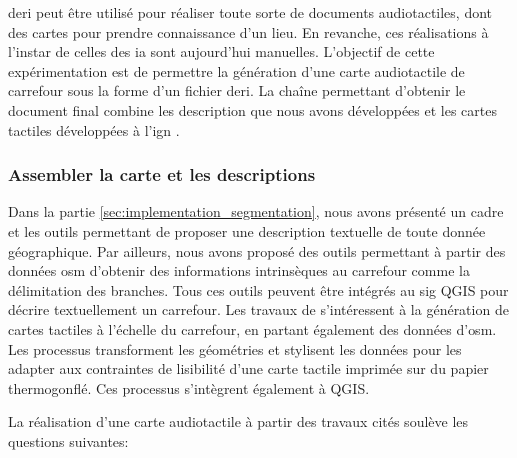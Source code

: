 \gls{deri} peut être utilisé pour réaliser toute sorte de documents audiotactiles, dont des cartes pour prendre connaissance d'un lieu. En revanche, ces réalisations à l'instar de celles des \gls{ia} sont aujourd'hui manuelles. L'objectif de cette expérimentation est de permettre la génération d'une carte audiotactile de carrefour sous la forme d'un fichier \gls{deri}. La chaîne permettant d'obtenir le document final combine les description que nous avons développées  et les cartes tactiles développées à l'\gls{ign} \citep{Jiang2023}.

\subsubsection{Assembler la carte et les descriptions}

Dans la partie \ref{sec:implementation_segmentation}, nous avons présenté un cadre et les outils permettant de proposer une description textuelle de toute donnée géographique. Par ailleurs, nous avons proposé des outils permettant à partir des données \gls{osm} d'obtenir des informations intrinsèques au carrefour comme la délimitation des branches. Tous ces outils peuvent être intégrés au \gls{sig} QGIS pour décrire textuellement un carrefour. Les travaux de \citet{Jiang2023} s'intéressent à la génération de cartes tactiles à l'échelle du carrefour, en partant également des données d'\gls{osm}. Les processus transforment les géométries et stylisent les données pour les adapter aux contraintes de lisibilité d'une carte tactile imprimée sur du papier thermogonflé. Ces processus s'intègrent également à QGIS.

\newpar{}

La réalisation d'une carte audiotactile à partir des travaux cités soulève les questions suivantes:

